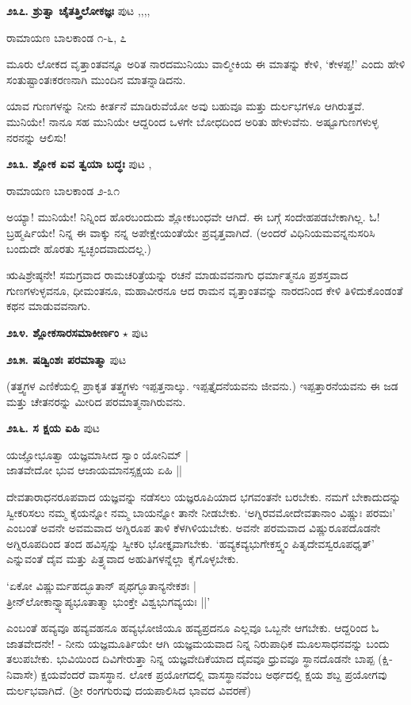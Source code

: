 \medskip
\noindent\textbf{೨೩೭. ಶ್ರುತ್ವಾ ಚೈತತ್ತ್ರಿಲೋಕಜ್ಞಃ} \hfill ಪುಟ \pageref{153},\pageref{163},\pageref{194},\pageref{246},\pageref{251}

\hfill ರಾಮಾಯಣ ಬಾಲಕಾಂಡ ೧-೬, ೭

ಮೂರು ಲೋಕದ ವೃತ್ತಾಂತವನ್ನೂ ಅರಿತ ನಾರದಮುನಿಯು ವಾಲ್ಮೀಕಿಯ ಈ ಮಾತನ್ನು ಕೇಳಿ, `ಕೇಳಪ್ಪ!' ಎಂದು ಹೇಳಿ ಸಂತುಷ್ಟಾಂತಃಕರಣನಾಗಿ ಮುಂದಿನ ಮಾತನ್ನಾಡಿದನು.

ಯಾವ ಗುಣಗಳನ್ನು ನೀನು ಕೀರ್ತನೆ ಮಾಡಿರುವೆಯೋ ಅವು ಬಹುವೂ ಮತ್ತು ದುರ್ಲಭಗಳೂ ಆಗಿರುತ್ತವೆ. ಮುನಿಯೇ! ನಾನೂ ಸಹ ಮುನಿಯೇ ಆದ್ದರಿಂದ ಒಳಗೇ ಬೋಧದಿಂದ ಅರಿತು ಹೇಳುವೆನು. ಅಷ್ಟೂಗುಣಗಳುಳ್ಳ ನರನನ್ನು ಆಲಿಸು!

\medskip
\noindent\textbf{೨೩೩. ಶ್ಲೋಕ ಏವ ತ್ವಯಾ ಬದ್ಧಃ} \hfill ಪುಟ \pageref{157},\pageref{181}

\hfill ರಾಮಾಯಣ ಬಾಲಕಾಂಡ ೨-೩೧

ಅಯ್ಯಾ! ಮುನಿಯೇ! ನಿನ್ನಿಂದ ಹೊರಬಂದುದು ಶ್ಲೋಕಬಂಧವೇ ಆಗಿದೆ. ಈ ಬಗ್ಗೆ ಸಂದೇಹಪಡಬೇಕಾಗಿಲ್ಲ. ಓ! ಬ್ರಹ್ಮರ್ಷಿಯೇ! ನಿನ್ನ ಈ ವಾಕ್ಕು  ನನ್ನ ಅಪೇಕ್ಷೇಯಂತೆಯೇ ಪ್ರವೃತ್ತವಾಗಿದೆ. (ಅಂದರೆ ವಿಧಿನಿಯಮವನ್ನನುಸರಿಸಿ ಬಂದುದೇ ಹೊರತು ಸ್ವಚ್ಛಂದವಾದುದಲ್ಲ.)

ಋಷಿಶ್ರೇಷ್ಠನೇ! ಸಮಗ್ರವಾದ ರಾಮಚರಿತ್ರೆಯನ್ನು ರಚನೆ ಮಾಡುವವನಾಗು ಧರ್ಮಾತ್ಮನೂ ಪ್ರಶಸ್ತವಾದ ಗುಣಗಳುಳ್ಳವನೂ, ಧೀಮಂತನೂ, ಮಹಾವೀರನೂ ಆದ ರಾಮನ ವೃತ್ತಾಂತವನ್ನು ನಾರದನಿಂದ ಕೇಳಿ ತಿಳಿದುಕೊಂಡಂತೆ ಕಥನ ಮಾಡುವವನಾಗು. 

\medskip
\noindent\textbf{೨೩೪. ಶ್ಲೋಕಸಾರಸಮಾಕೀರ್ಣಂ} $\star$ \hfill ಪುಟ \pageref{152}

\medskip
\noindent\textbf{೨೩೫. ಷಡ್ವಿಂಶಃ ಪರಮಾತ್ಮಾ} \hfill ಪುಟ \pageref{185}

(ತತ್ತ್ವಗಳ ಎಣಿಕೆಯಲ್ಲಿ ಪ್ರಾಕೃತ ತತ್ತ್ವಗಳು ಇಪ್ಪತ್ತನಾಲ್ಕು. ಇಪ್ಪತ್ತೈದನೆಯವನು ಜೀವನು.) ಇಪ್ಪತ್ತಾರನೆಯವನು ಈ ಜಡ ಮತ್ತು ಚೇತನರನ್ನು ಮೀರಿದ ಪರಮಾತ್ಮನಾಗಿರುವನು. 

\medskip
\noindent\textbf{೨೩೬. ಸ ಕ್ಷಯ ಏಹಿ} \hfill ಪುಟ \pageref{162}

\begin{shloka}
ಯಜ್ಞೋಭೂತ್ವಾ ಯಜ್ಞಮಾಸೀದ ಸ್ವಾಂ ಯೋನಿಮ್ |\\
ಜಾತವೇದೋ ಭುವ ಆಜಾಯಮಾನಸ್ಸಕ್ಷಯ ಏಹಿ ||
\end{shloka} 

ದೇವತಾರಾಧನರೂಪವಾದ ಯಜ್ಞವನ್ನು ನಡೆಸಲು ಯಜ್ಞರೂಪಿಯಾದ ಭಗವಂತನೇ ಬರಬೇಕು. ನಮಗೆ ಬೇಕಾದುದನ್ನು ಸ್ವೀಕರಿಸಲು ನಮ್ಮ ಕೈಯನ್ನೋ ನಮ್ಮ ಬಾಯನ್ನೋ ತಾನೇ ನೀಡಬೇಕು. `ಅಗ್ನಿರವಮೋದೇವತಾನಾಂ ವಿಷ್ಣುಃ ಪರಮಃ' ಎಂಬಂತೆ ಅವನೇ ಅವಮವಾದ ಅಗ್ನಿರೂಪ ತಾಳಿ ಕೆಳಗಿಳಿಯಬೇಕು. ಅವನೇ ಪರಮವಾದ ವಿಷ್ಣುರೂಪದೊಡನೇ ಅಗ್ನಿರೂಪದಿಂದ ತಂದ ಹವಿಸ್ಸನ್ನು ಸ್ವೀಕರಿ ಭೋಕ್ತೃವಾಗಬೇಕು. `ಹವ್ಯಕವ್ಯಭುಗೇಕಸ್ತ್ವಂ ಪಿತೃದೇವಸ್ವರೂಪಧೃತ್' ಎನ್ನುವಂತೆ ದೈವ ಮತ್ತು ಪಿತ್ರ್ಯವಾದ ಅಹುತಿಗಳನ್ನೆಲ್ಲಾ ಕೈಗೊಳ್ಳಬೇಕು.

\begin{shloka}
`ಏಕೋ ವಿಷ್ಣುರ್ಮಹದ್ಭೂತಾನ್ ಪೃಥಗ್ಭೂತಾನ್ಯನೇಕಶಃ |\\
ತ್ರೀನ್‌ಲೋಕಾನ್ವ್ಯಾಪ್ಯಭೂತಾತ್ಮಾ ಭುಂಕ್ತೇ ವಿಶ್ವಭುಗವ್ಯಯಃ ||'
\end{shloka}
ಎಂಬಂತೆ ಹವ್ಯವೂ ಹವ್ಯವಹನೂ ಹವ್ಯಭೋಜಿಯೂ ಹವ್ಯಪ್ರದನೂ ಎಲ್ಲವೂ ಒಬ್ಬನೇ ಆಗಬೇಕು. ಆದ್ದರಿಂದ ಓ ಜಾತವೇದನೇ! - ನೀನು ಯಜ್ಞಮೂರ್ತಿಯೇ ಆಗಿ ಯಜ್ಞಮಯವಾದ ನಿನ್ನ ನಿರುಪಾಧಿಕ ಮೂಲಸಾಧನವನ್ನು ಬಂದು ತಲುಪಬೇಕು. ಭುವಿಯಿಂದ ದಿವಿಗೇರುತ್ತಾ ನಿನ್ನ ಯಜ್ಞವೇದಿಕೆಯಾದ ದೈವವೂ ಧ್ರುವವೂ ಸ್ಥಾನದೊಡನೇ ಬಾಪ್ಪ (ಕ್ಷಿ-ನಿವಾಸೇ) ಕ್ಷಯವೆಂದರೆ ವಾಸಸ್ಥಾನ. ಲೋಕ ಪ್ರಯೋಗದಲ್ಲಿ ವಾಸಸ್ಥಾನವೆಂಬ ಅರ್ಥದಲ್ಲಿ ಕ್ಷಯ ಶಬ್ದ ಪ್ರಯೋಗವು ದುರ್ಲಭವಾಗಿದೆ. (ಶ್ರೀ ರಂಗಗುರುವು ದಯಪಾಲಿಸಿದ ಭಾವದ ವಿವರಣೆ)

